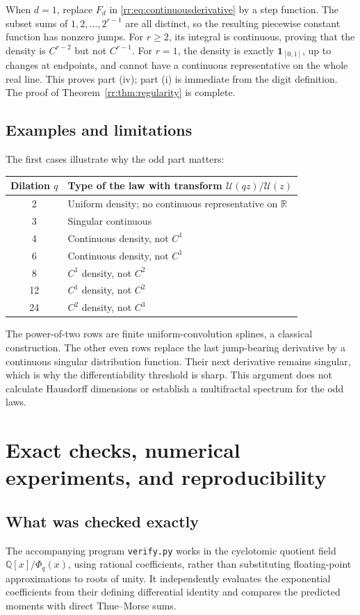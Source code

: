 \documentclass[11pt,a4paper,oneside,openany]{book}
\numberwithin{equation}{chapter}
\theoremstyle{definition}
\theoremstyle{remark}
\newcommand{\R}{\mathbb R}
\newcommand{\Q}{\mathbb Q}
\newcommand{\Up}{\mathcal U}
\begin{document}
When \(d=1\), replace \(F_d\) in \eqref{rr:eq:continuousderivative} by a step function. The subset sums of \(1,2,\ldots,2^{r-1}\) are all distinct, so the resulting piecewise constant function has nonzero jumps. For \(r\geq2\), its integral is continuous, proving that the density is \(C^{r-2}\) but not \(C^{r-1}\). For \(r=1\), the density is exactly \(\mathbf1_{[0,1]}\), up to changes at endpoints, and cannot have a continuous representative on the whole real line. This proves part (iv); part (i) is immediate from the digit definition. The proof of Theorem~\ref{rr:thm:regularity} is complete.

\section{Examples and limitations}
The first cases illustrate why the odd part matters:
\begin{center}
\begin{tabular}{cl}
\toprule
Dilation \(q\)&Type of the law with transform \(\Up(qz)/\Up(z)\)\\
\midrule
2&Uniform density; no continuous representative on \(\R\)\\
3&Singular continuous\\
4&Continuous density, not \(C^1\)\\
6&Continuous density, not \(C^1\)\\
8&\(C^1\) density, not \(C^2\)\\
12&\(C^1\) density, not \(C^2\)\\
24&\(C^2\) density, not \(C^3\)\\
\bottomrule
\end{tabular}
\end{center}
The power-of-two rows are finite uniform-convolution splines, a classical construction. The other even rows replace the last jump-bearing derivative by a continuous singular distribution function. Their next derivative remains singular, which is why the differentiability threshold is sharp. This argument does not calculate Hausdorff dimensions or establish a multifractal spectrum for the odd laws.
\chapter{Exact checks, numerical experiments, and reproducibility}
\label{rr:sec:checks}

\section{What was checked exactly}
The accompanying program \texttt{verify.py} works in the cyclotomic quotient field \(\Q[x]/\Phi_q(x)\), using rational coefficients, rather than substituting floating-point approximations to roots of unity. It independently evaluates the exponential coefficients from their defining differential identity and compares the predicted moments with direct Thue--Morse sums.
\end{document}
